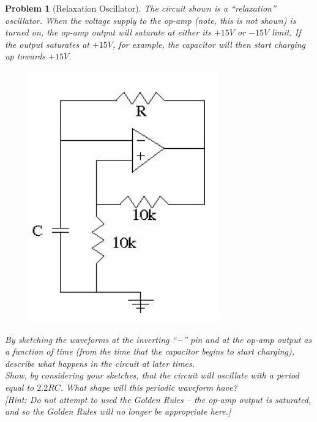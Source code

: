 \documentclass[a4paper]{article}
\theoremstyle{new}
\newtheorem{qns}{Problem}[section]
\begin{document}
\begin{qns}[Relaxation Oscillator]
The circuit shown is a “relaxation” oscillator. When the voltage supply to the op-amp (note, this is not shown) is turned on, the op-amp output will saturate at either its $+15V$ or $-15V$ limit. If the output saturates at $+15V$, for example, the capacitor will then start charging up towards $+ 15V$. 
\begin{figure}[H]
    \centering
    \includegraphics[scale=0.9]{1_5.PNG}
\end{figure}
By sketching the waveforms at the inverting “−” pin and at the op-amp output as a function of time (from the time that the capacitor begins to start charging), describe what happens in the circuit at later times.\\[5pt]
Show, by considering your sketches, that the circuit will oscillate with a period equal to $2.2 RC$. What shape will this periodic waveform have?\\[5pt]
[Hint: Do not attempt to used the Golden Rules – the op-amp output is saturated, and so the Golden Rules will no longer be appropriate here.]
\end{qns}
\end{document}

